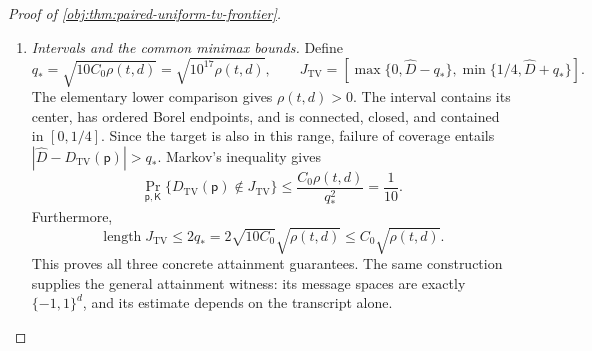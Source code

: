 \documentclass[11pt]{article}
\begin{document}
\begin{proof}[Proof of \cref{obj:thm:paired-uniform-tv-frontier}]
\begin{enumerate}
The global-polynomial conclusion of
\cref{obj:lem:finite-private-polynomial-calibration} now yields
\[
\mathbb E(\widehat F-F(\theta))^2
\le\frac{e^{9DH}}{2d}+\frac1{(D+1)^2}.
\]
The degree budget gives \(9DH\le L/100\).
For \(L\ge4096\), the elementary exponential inequalities
\[
L^2\le16e^{L/2},
\qquad
4\le e^{49L/100-1}
\]
imply
\[
L^2e^{L/100}\le4e^{L-1}=4d.
\]
Therefore
\[
\frac{e^{9DH}}{2d}\le\frac2{L^2}\le2\rho(t,d),
\qquad
\frac1{D+1}\le\frac{2048H}{L}
\le\frac{12288w}{L},
\]
and hence
\[
\frac1{(D+1)^2}\le150994944\,\rho(t,d).
\]
The elementary lower comparison, together with \(\rho(t,d)<1\), gives
\(t^{-1}\le\rho(t,d)\). Thus
\[
\frac{24}{t}
+\frac12\left(\frac{e^{9DH}}{2d}+\frac1{(D+1)^2}\right)
\le75497500\,\rho(t,d)
\le C_0\rho(t,d).
\]
Clipping again completes the risk bound. Every admissible tuple has therefore been covered:
\[
\sup_{\mathsf p\in\mathcal P_d^{\mathrm{pair}}}
\mathbb E_{\mathsf p,\mathsf K}
(\widehat D-D_{\mathrm{TV}}(\mathsf p))^2
\le C_0\rho(t,d).
\]

\item \textit{Intervals and the common minimax bounds.}
Define
\[
q_*=\sqrt{10C_0\rho(t,d)}=\sqrt{10^{17}\rho(t,d)},
\qquad
J_{\mathrm{TV}}
=
\left[
\max\{0,\widehat D-q_*\},
\min\{1/4,\widehat D+q_*\}
\right].
\]
The elementary lower comparison gives \(\rho(t,d)>0\).
The interval contains its center, has ordered Borel endpoints, and is connected, closed, and contained in \([0,1/4]\).
Since the target is also in this range, failure of coverage entails
\(|\widehat D-D_{\mathrm{TV}}(\mathsf p)|>q_*\). Markov's inequality gives
\[
\Pr_{\mathsf p,\mathsf K}
\{D_{\mathrm{TV}}(\mathsf p)\notin J_{\mathrm{TV}}\}
\le\frac{C_0\rho(t,d)}{q_*^2}
=\frac1{10}.
\]
Furthermore,
\[
\operatorname{length}J_{\mathrm{TV}}
\le2q_*
=2\sqrt{10C_0}\sqrt{\rho(t,d)}
\le C_0\sqrt{\rho(t,d)}.
\]
This proves all three concrete attainment guarantees.
The same construction supplies the general attainment witness: its message spaces are exactly \(\{-1,1\}^d\), and its estimate depends on the transcript alone.


\end{enumerate}
\end{proof}
\end{document}
